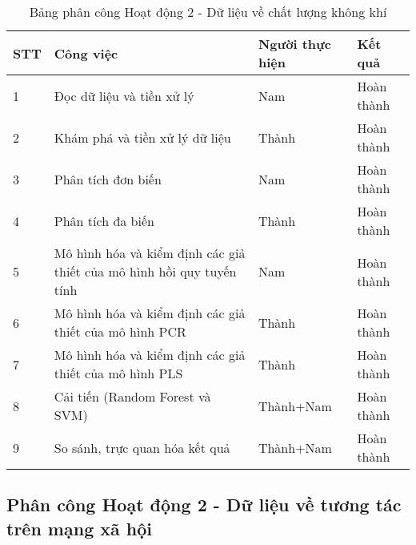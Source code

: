 \begin{table}[H]
    \centering 
    \caption{Bảng phân công Hoạt động 2 - Dữ liệu về chất lượng không khí}
    \label{tab:phancong5}
    \begin{tabular}{|l|p{6cm}|l|l|}
    \hline
    STT & Công việc                                                   & Người thực hiện & Kết quả    \\ \hline
    1   & Đọc dữ liệu và tiền xử lý                                   & Nam             & Hoàn thành \\ \hline
    2   & Khám phá và tiền xử lý dữ liệu                              & Thành           & Hoàn thành \\ \hline
    3   & Phân tích đơn biến                                          & Nam           & Hoàn thành \\ \hline
    4   & Phân tích đa biến                                          & Thành           & Hoàn thành \\ \hline
    5   & Mô hình hóa và kiểm định các giả thiết của mô hình hồi quy tuyến tính  & Nam           & Hoàn thành \\ \hline
    6   & Mô hình hóa và kiểm định các giả thiết của mô hình PCR  & Thành           & Hoàn thành \\ \hline
    7   & Mô hình hóa và kiểm định các giả thiết của mô hình PLS  & Thành           & Hoàn thành \\ \hline
    8   & Cải tiến (Random Forest và SVM) & Thành+Nam           & Hoàn thành \\ \hline
    9   & So sánh, trực quan hóa kết quả & Thành+Nam           & Hoàn thành \\ \hline
    \end{tabular}
\end{table}


\subsection{Phân công Hoạt động 2 - Dữ liệu về tương tác trên mạng xã hội}

